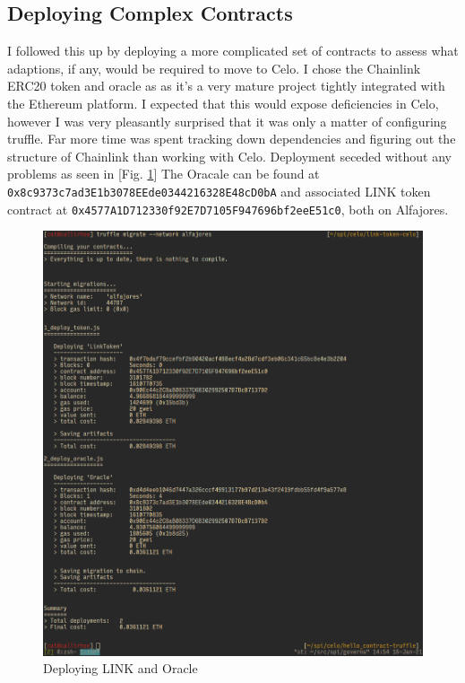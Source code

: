 \documentclass[a4paper,11pt]{article}
\begin{document}
\subsection*{Deploying Complex Contracts}
I followed this up by deploying a more complicated set of contracts to assess
what adaptions, if any, would be required to move to Celo.  I chose the
Chainlink ERC20 token and oracle as
as it's a very mature project tightly integrated with the Ethereum platform.  I
expected that this would expose deficiencies in Celo, however I was very
pleasantly surprised that it was only a matter of configuring truffle.  Far more
time was spent tracking down dependencies and figuring out the structure of
Chainlink than working with Celo.  Deployment seceded without any problems as
seen in [Fig. \ref{fig:chainlink}]
The Oracale can be found at \verb|0x8c9373c7ad3E1b3078EEde0344216328E48cD0bA|
and associated LINK token contract at
\verb|0x4577A1D712330f92E7D7105F947696bf2eeE51c0|, both on Alfajores.

\begin{figure}[hbt!]
  \centering
  \includegraphics{deploy-chainlink}
  \caption{Deploying LINK and Oracle}
  \label{fig:chainlink}
\end{figure}
\end{document}
